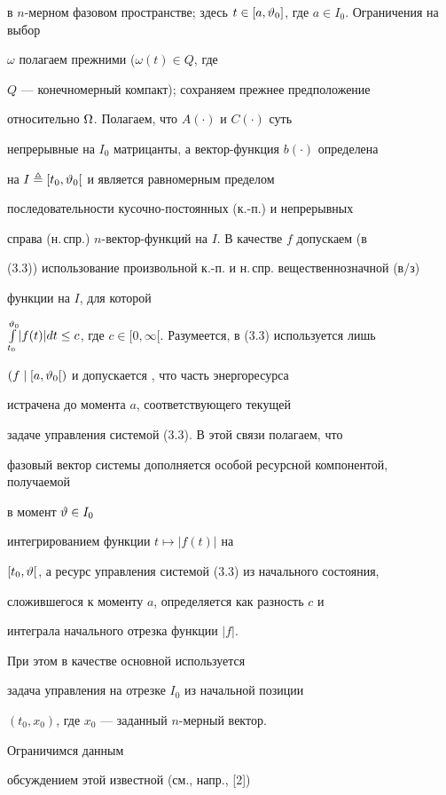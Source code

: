 в $n$-мерном фазовом пространстве; здесь $t


\in [a,{{\vt}_0}]$, где $a \in {I_0}$. Ограничения на выбор


$\omega$ полагаем прежними (${{\omega}(t)} \in Q$, где


$Q$ --- конечномерный компакт); сохраняем прежнее предположение


относительно $\Omega$. Полагаем, что $A(\cdot)$ и $C(\cdot)$ суть


непрерывные на $I_0$ матрицанты, а вектор-функция $b(\cdot)$ определена


на $I \triangleq [{t_0},{{\vartheta}_0}[$ и является равномерным пределом


последовательности кусочно-постоянных (к.-п.) и непрерывных


справа (н.\,спр.) $n$-вектор-функций на $I$. В качестве $f$ допускаем (в


(3.3)) использование произвольной к.-п. и н.\,спр. вещественнозначной (в/з)


функции на $I$, для которой


${\int\limits_{t_0}^{{\vt}_0}}|{f(t)}|{dt}


\le c$, где $c \in [0,\infty[$. Разумеется, в (3.3) используется лишь


$(f \mid [a,{{\vartheta}_0}[)$ и допускается , что часть энергоресурса


истрачена до момента $a$, соответствующего текущей


задаче управления системой (3.3). В этой связи полагаем, что


фазовый вектор системы дополняется особой ресурсной компонентой, получаемой


в момент $\vartheta \in {I_0}$


интегрированием функции $t \longmapsto |f(t)|$ на


$[{t_0},\vartheta[$, а ресурс управления системой (3.3) из начального состояния,


сложившегося к моменту $a$, определяется как разность $c$ и


интеграла начального отрезка функции $|f|$.


При этом в качестве основной используется


задача управления на отрезке $I_0$ из начальной позиции


$({t_0},{x_0})$, где $x_0$ --- заданный $n$-мерный вектор.


Ограничимся данным


обсуждением этой известной (см., напр., [2])


